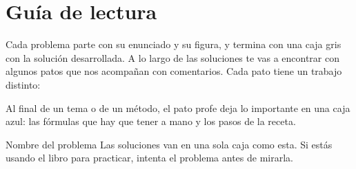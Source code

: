 \chapter*{Guía de lectura}

Cada problema parte con su enunciado y su figura, y termina con una caja gris con la
solución desarrollada. A lo largo de las soluciones te vas a encontrar con algunos patos que
nos acompañan con comentarios. Cada pato tiene un trabajo distinto:




\begin{resumen}
Al final de un tema o de un método, el pato profe deja lo importante en una caja azul:
las fórmulas que hay que tener a mano y los pasos de la receta.
\end{resumen}

\begin{solucion}{Nombre del problema}
Las soluciones van en una sola caja como esta. Si estás usando el libro para practicar,
intenta el problema antes de mirarla.
\end{solucion}
\clearpage
